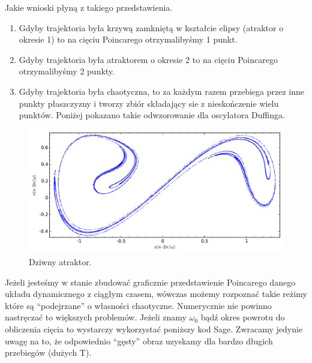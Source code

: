 \documentclass[a4paper,12pt,polish]{sphinxmanual}
\begin{document}
Jakie wnioski płyną z takiego przedstawienia.
\begin{enumerate}
\item {} 
Gdyby trajektoria była krzywą zamkniętą w kształcie elipsy (atraktor o okresie 1) to na cięciu Poincarego otrzymalibyśmy 1 punkt.

\end{enumerate}
\begin{enumerate}
\setcounter{enumi}{1}
\item {} 
Gdyby trajektoria była atraktorem  o okresie 2  to na cięciu Poincarego otrzymalibyśmy 2 punkty.

\end{enumerate}
\begin{enumerate}
\setcounter{enumi}{2}
\item {} 
Gdyby trajektoria była chaotyczna, to za każdym razem przebiega przez inne punkty płaszczyzny i tworzy zbiór składający sie z nieskończenie wielu punktów. Poniżej pokazano takie odwzorowanie dla oscylatora Duffinga.

\end{enumerate}
\begin{figure}[htbp]
\centering
\capstart

\includegraphics{chaotic_duffing.pdf}
\caption{Dziwny atraktor.}\end{figure}

Jeżeli jesteśmy w stanie zbudować graficznie przedstawienie Poincarego danego układu dynamicznego z ciągłym czasem, wówczas możemy rozpoznać takie reżimy które są ``podejrzane'' o własności chaotyczne.  Numerycznie nie powinno nastręczać to większych problemów. Jeżeli znamy $\omega_0$ bądź okres powrotu do obliczenia cięcia to wystarczy wykorzystać poniższy kod Sage. Zwracamy jedynie uwagę na to, że odpowiednio ``gęsty'' obraz uzyskamy dla bardzo długich przebiegów (dużych T).
\end{document}
